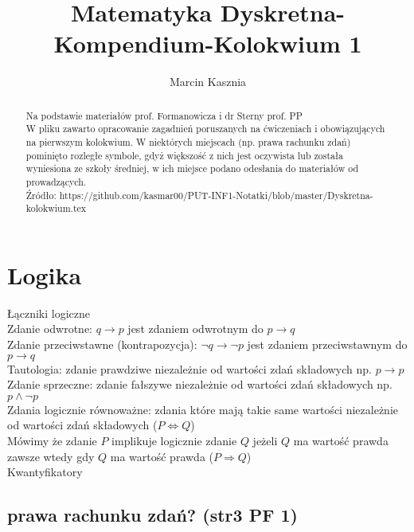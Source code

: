 \documentclass[a4paper,12pt]{article}
\title{Matematyka Dyskretna-Kompendium-Kolokwium 1}
\author{Marcin Kasznia}
\begin{document}
\maketitle
\begin{abstract}
Na podstawie materiałów prof. Formanowicza i dr Sterny prof. PP\\
W pliku zawarto opracowanie zagadnień poruszanych na ćwiczeniach i obowiązujących na pierwszym kolokwium. W niektórych miejscach (np. prawa rachunku zdań) pominięto rozległe symbole, gdyż większość z nich jest oczywista lub została wyniesiona ze szkoły średniej, w ich miejsce podano odesłania do materiałów od prowadzących.\\
Źródło: https://github.com/kasmar00/PUT-INF1-Notatki/blob/master/Dyskretna-kolokwium.tex \\
\end{abstract}

\section{Logika}
Łączniki logiczne \\
Zdanie odwrotne: $q \to p$ jest zdaniem odwrotnym do $p \to q$ \\
Zdanie przeciwstawne (kontrapozycja): $\neg q \to \neg p$ jest zdaniem przeciwstawnym do $p \to q$ \\
Tautologia: zdanie prawdziwe niezależnie od wartości zdań składowych np. $p\to p$ \\
Zdanie sprzeczne: zdanie fałszywe niezależnie od wartości zdań składowych np. $p \land \neg p $ \\
Zdania logicznie równoważne: zdania które mają takie same wartości niezależnie od wartości zdań składowych ($P \Leftrightarrow Q $) \\
Mówimy że zdanie $P$ implikuje logicznie zdanie $Q$ jeżeli $Q$ ma wartość prawda zawsze wtedy gdy $Q$ ma wartość prawda ($P \Rightarrow Q$)\\
Kwantyfikatory
\subsection{prawa rachunku zdań? (str3 PF 1)}
\end{document}
